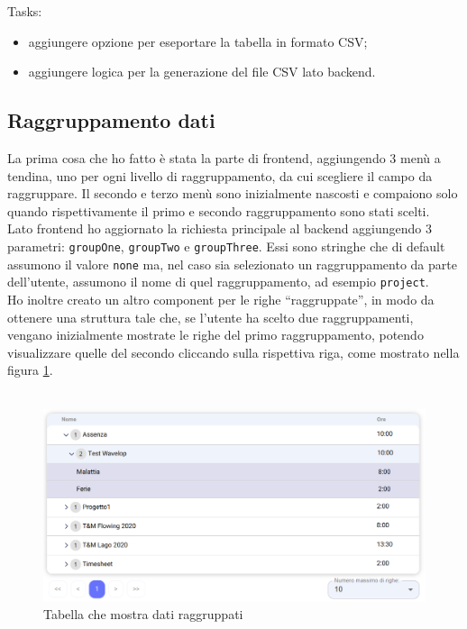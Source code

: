 \noindent Tasks:
\begin{itemize}
  \item aggiungere opzione per eseportare la tabella in formato CSV;
  \item aggiungere logica per la generazione del file CSV lato backend.
\end{itemize}


\subsection{Raggruppamento dati}
La prima cosa che ho fatto è stata la parte di frontend, aggiungendo 3 menù a tendina, uno per ogni livello di raggruppamento, da cui scegliere il campo da raggruppare. Il secondo e terzo menù sono inizialmente nascosti e compaiono solo quando rispettivamente il primo e secondo raggruppamento sono stati scelti.\\
Lato frontend ho aggiornato la richiesta principale al backend aggiungendo 3 parametri: \texttt{groupOne}, \texttt{groupTwo} e \texttt{groupThree}. Essi sono stringhe che di default assumono il valore \texttt{none} ma, nel caso sia selezionato un raggruppamento da parte dell'utente, assumono il nome di quel raggruppamento, ad esempio \texttt{project}.\\
Ho inoltre creato un altro component per le righe ``raggruppate'', in modo da ottenere una struttura tale che, se l'utente ha scelto due raggruppamenti, vengano inizialmente mostrate le righe del primo raggruppamento, potendo visualizzare quelle del secondo cliccando sulla rispettiva riga, come mostrato nella figura \ref{fig:report_groupedtable}.\\\\
\begin{figure}[H]
	\includegraphics[width = \textwidth]{immagini/reports table groupings.png}
	\caption{Tabella che mostra dati raggruppati}
	\label{fig:report_groupedtable}
\end{figure}
